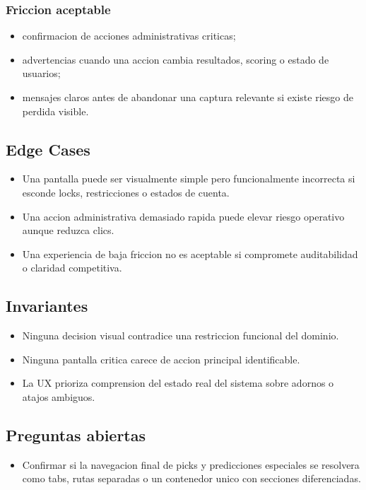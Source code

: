 \subsubsection{Friccion aceptable}

\begin{itemize}
  \item confirmacion de acciones administrativas criticas;
  \item advertencias cuando una accion cambia resultados, scoring o estado de usuarios;
  \item mensajes claros antes de abandonar una captura relevante si existe riesgo de perdida visible.
\end{itemize}

\subsection{Edge Cases}

\begin{itemize}
  \item Una pantalla puede ser visualmente simple pero funcionalmente incorrecta si esconde locks, restricciones o estados de cuenta.
  \item Una accion administrativa demasiado rapida puede elevar riesgo operativo aunque reduzca clics.
  \item Una experiencia de baja friccion no es aceptable si compromete auditabilidad o claridad competitiva.
\end{itemize}

\subsection{Invariantes}

\begin{itemize}
  \item Ninguna decision visual contradice una restriccion funcional del dominio.
  \item Ninguna pantalla critica carece de accion principal identificable.
  \item La UX prioriza comprension del estado real del sistema sobre adornos o atajos ambiguos.
\end{itemize}

\subsection{Preguntas abiertas}

\begin{itemize}
  \item Confirmar si la navegacion final de picks y predicciones especiales se resolvera como tabs, rutas separadas o un contenedor unico con secciones diferenciadas.
\end{itemize}

